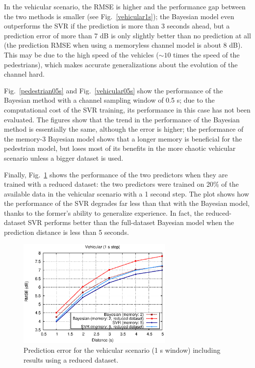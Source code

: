 \documentclass[conference, a4paper]{IEEEtran}
\begin{document}
In the vehicular scenario, the RMSE is higher and the performance gap between the two methods is smaller (see Fig.~\ref{vehicular1s}); the Bayesian model even outperforms the SVR if the prediction is more than 3 seconds ahead, but a prediction error of more than 7 dB is only slightly better than no prediction at all (the prediction RMSE when using a memoryless channel model is about 8 dB). This may be due to the high speed of the vehicles ($\sim10$ times the speed of the pedestrians), which makes accurate generalizations about the evolution of the channel hard.

Fig.~\ref{pedestrian05s} and Fig.~\ref{vehicular05s} show the performance of the Bayesian method with a channel sampling window of 0.5 s; due to the computational cost of the SVR training, its performance in this case has not been evaluated.
The figures show that the trend in the performance of the Bayesian method is essentially the same, although the error is higher; the performance of the memory-3 Bayesian model shows that a longer memory is beneficial for the pedestrian model, but loses most of its benefits in the more chaotic vehicular scenario unless a bigger dataset is used.

Finally, Fig.~\ref{vehicularlowdata} shows the performance of the two predictors when they are trained with a reduced dataset: the two predictors were trained on 20\% of the available data in the vehicular scenario with a 1 second step. The plot shows how the performance of the SVR degrades far less than that with the Bayesian model, thanks to the former's ability to generalize experience. In fact, the reduced-dataset SVR performs better than the full-dataset Bayesian model when the prediction distance is less than 5 seconds.

\begin{figure}[t]
\centering
\includegraphics[width=3in]{./graphics/lowdata_vehicular_1s.eps}
\caption{Prediction error for the vehicular scenario (1 s window) including results using a reduced dataset.}
\label{vehicularlowdata}
\end{figure}
\end{document}
